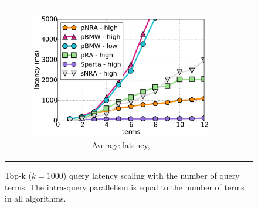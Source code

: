 \begin{figure}[tbh]
\begin{tabular}{ccc}
    \begin{subfigure}[t]{0.3\textwidth}
    \includegraphics[width=\textwidth]{figures/latency_12threads_cluewebX10.pdf}
	\caption{Average latency, \cwten}
    \end{subfigure}  
\end{tabular}
\caption{Top-k ($k=1000$) query latency scaling with the number of query terms. 
The intra-query parallelism is equal to the number of terms in all algorithms. }
\label{fig:terms-scaling}
\end{figure}


